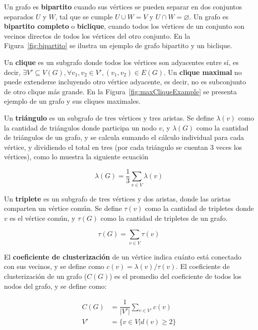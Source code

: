 Un grafo es \textbf{bipartito} cuando sus vértices se pueden separar en dos conjuntos separados $U$ y $W$, tal que se cumple $U \cup W = V$ y $U \cap W = \varnothing$. Un grafo es \textbf{bipartito completo} o \textbf{biclique}, cuando todos los vértices de un conjunto son vecinos directos de todos los vértices del otro conjunto. En la Figura~\ref{fig:bipartito} se ilustra un ejemplo de grafo bipartito y un biclique.


Un \textbf{clique} es un subgrafo donde todos los vértices son adyacentes entre sí, es decir, $\exists V' \subseteq V(G), \forall v_{1}, v_{2} \in V', (v_{1}, v_{2}) \in E(G) $. Un \textbf{clique maximal} no puede extenderse incluyendo otro vértice adyacente, es decir, no es subconjunto de otro clique más grande. En la Figura~\ref{fig:maxCliqueExample} se presenta ejemplo de un grafo y sus cliques maximales.



Un \textbf{triángulo} es un subgrafo de tres vértices y tres aristas. Se define $\lambda(v)$ como la cantidad de triángulos donde participa un nodo $v$, y $\lambda(G)$ como la cantidad de triángulos de un grafo, y se calcula sumando el cálculo individual para cada vértice, y dividiendo el total en tres (por cada triángulo se cuentan 3 veces los vértices), como lo muestra la siguiente ecuación

\begin{equation}
	\lambda(G) = \dfrac{1}{3} \sum_{v \in V} \lambda(v) \label{eq:triangles}
\end{equation}

Un \textbf{triplete} es un subgrafo de tres vértices y dos aristas, donde las aristas comparten un vértice común. Se define $\tau(v)$ como la cantidad de tripletes donde $v$ es el vértice común, y $\tau(G)$ como la cantidad de tripletes de un grafo.

\begin{equation}
	\tau(G) = \sum_{v \in V} \tau(v) \label{eq:triplets}
\end{equation}

El \textbf{coeficiente de clusterización} de un vértice indica cuánto está conectado con sus vecinos, y se define como $c(v) =  \lambda(v) / \tau(v)$. El coeficiente de clusterización de un grafo ($C(G)$) es el promedio del coeficiente de todos los nodos del grafo, y se define como:

\begin{align}
	C(G) &= \dfrac{1}{|V'|} \sum_{v \in V'} c(v) \label{eq:CC} \\
	V' &= \{ v \in V | d(v) \geq 2 \} \nonumber
\end{align}

